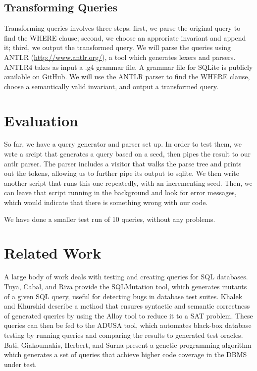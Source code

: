 \documentclass[conference]{acmsiggraph}
\begin{document}
\subsection{Transforming Queries}

Transforming queries involves three steps: first, we parse the original query to find the WHERE clause; second, we choose an approriate invariant and append it; third, we output the transformed query. We will parse the queries using ANTLR (\url{http://www.antlr.org/}), a tool which generates lexers and parsers. ANTLR4 takes as input a .g4 grammar file. A grammar file for SQLite is publicly available on GitHub. We will use the ANTLR parser to find the WHERE clause, choose a semantically valid invariant, and output a transformed query.

\section{Evaluation}

So far, we have a query generator and parser set up. In order to test them, we wrte a srcipt that generates a query based on a seed, then pipes the result to our antlr parser. The parser includes a visitor that walks the parse tree and prints out the tokens, allowing us to further pipe its output to sqlite. We then write another script that runs this one repeatedly, with an incrementing seed. Then, we can leave that script running in the background and look for error messages, which would indicate that there is something wrong with our code.

We have done a smaller test run of 10 queries, without any problems.

\section{Related Work}

A large body of work deals with testing and creating queries for SQL databases. Tuya, Cabal, and Riva\cite{Tuya:2006} provide the SQLMutation tool, which generates mutants of a given SQL query, useful for detecting bugs in database test suites. Khalek and Khurshid\cite{AbdulKhalek:2010:ASQ:1858996.1859063} describe a method that ensures syntactic and semantic correctness of generated queries by using the Alloy tool to reduce it to a SAT problem. These queries can then be fed to the ADUSA tool, which automates black-box database testing by running queries and comparing the results to generated test oracles. Bati, Giakoumakis, Herbert, and Surna\cite{Bati:2007:GAR:1325851.1325993} present a genetic programming algorithm which generates a set of queries that achieve higher code coverage in the DBMS under test.
\end{document}
